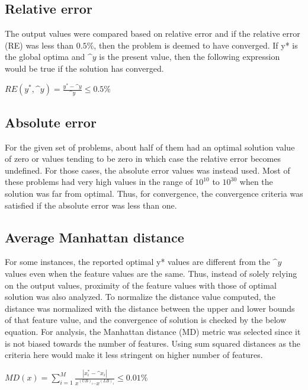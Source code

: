 \subsection{Relative error}
The output values were compared based on relative error and if the relative error (RE) was less than $0.5\%$, then the problem is deemed to have converged. If y* is the global optima and $\^{y}$ is the present value, then the following expression would be true if the solution has converged.
\begin{center}
$RE(y^{\ast},\^{y}) = \displaystyle\frac{y^{\ast}-\^{y}}{\^{y}} \leq 0.5\%$
\end{center}


\subsection{Absolute error}

For the given set of problems, about half of them had an optimal solution value of zero or values tending to be zero in which case the relative error becomes undefined. For those cases, the absolute error values was instead used. Most of these problems had very high values in the range of $10^{10}$ to $10^{30}$ when the solution was far from optimal. Thus, for convergence, the convergence criteria was satisfied if the absolute error was less than one.

\subsection{Average Manhattan distance}
For some instances, the reported optimal y* values are different from the $\^{y}$ values even when the feature values are the same. Thus, instead of solely relying on the output values, proximity of the feature values with those of optimal solution was also analyzed. To normalize the distance value computed, the distance was normalized with the distance between the upper and lower bounds of that feature value, and the convergence of solution is checked by the below equation. For analysis, the Manhattan distance (MD) metric was selected since it is not biased towards the number of features. Using sum squared distances as the criteria here would make it less stringent on higher number of features.

\begin{center}%
\mbox{\large\( %
MD(x) = \displaystyle\sum_{i=1}^M\frac{ |x^*_i - \^{x}_i | }{ x^{(UB)_i} – x^{(LB)_i} } \leq 0.01\%
\)} %
\end{center}

